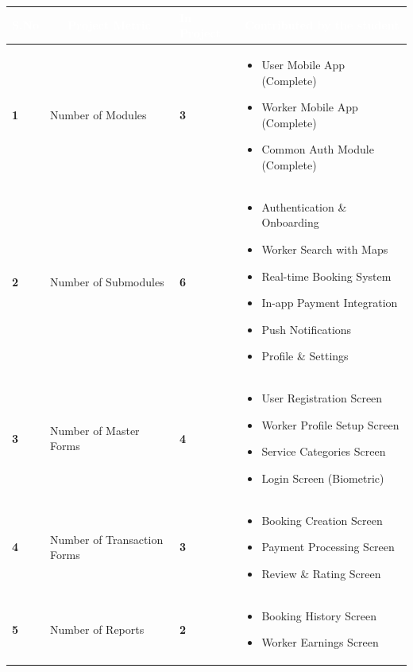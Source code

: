 \documentclass[12pt,a4paper]{article}
\begin{document}
\begin{table}[h!]
\centering
\renewcommand{\arraystretch}{1.3}
\begin{tabular}{|>{\centering\arraybackslash}p{1cm}|p{4.5cm}|>{\centering\arraybackslash}p{1.5cm}|p{7.5cm}|}
\hline
\rowcolor{headerblue}
\textcolor{white}{\textbf{S.No}} & 
\multicolumn{1}{c|}{\textcolor{white}{\textbf{Project Metric}}} & 
\textcolor{white}{\textbf{In Project}} & 
\multicolumn{1}{c|}{\textcolor{white}{\textbf{Contributed by the student}}} \\
\hline
\rowcolor{lightgray}
\textbf{1} & Number of Modules & \textbf{3} & 
\begin{itemize}[nosep, leftmargin=*, topsep=0pt]
    \item User Mobile App (Complete)
    \item Worker Mobile App (Complete)
    \item Common Auth Module (Complete)
\end{itemize} \\
\hline

\textbf{2} & Number of Submodules & \textbf{6} & 
\begin{itemize}[nosep, leftmargin=*, topsep=0pt]
    \item Authentication \& Onboarding
    \item Worker Search with Maps
    \item Real-time Booking System
    \item In-app Payment Integration
    \item Push Notifications
    \item Profile \& Settings
\end{itemize} \\
\hline
\rowcolor{lightgray}
\textbf{3} & Number of Master Forms & \textbf{4} & 
\begin{itemize}[nosep, leftmargin=*, topsep=0pt]
    \item User Registration Screen
    \item Worker Profile Setup Screen
    \item Service Categories Screen
    \item Login Screen (Biometric)
\end{itemize} \\
\hline

\textbf{4} & Number of Transaction Forms & \textbf{3} & 
\begin{itemize}[nosep, leftmargin=*, topsep=0pt]
    \item Booking Creation Screen
    \item Payment Processing Screen
    \item Review \& Rating Screen
\end{itemize} \\
\hline
\rowcolor{lightgray}
\textbf{5} & Number of Reports & \textbf{2} & 
\begin{itemize}[nosep, leftmargin=*, topsep=0pt]
    \item Booking History Screen
    \item Worker Earnings Screen
\end{itemize} \\
\hline


\end{tabular}
\end{table}
\end{document}
